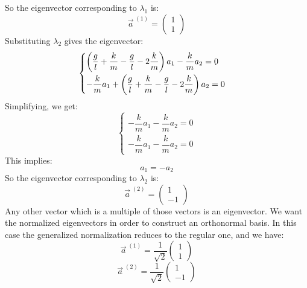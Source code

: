 So the eigenvector corresponding to $\lambda_1$ is:
\begin{equation}
    \vec{a}^{\;(1)} = \begin{pmatrix}
        1\\
        1
    \end{pmatrix}
\end{equation}
Substituting $\lambda_2$ gives the eigenvector:
\begin{equation}
    \begin{cases}
        \left(\dfrac{g}{l} + \dfrac{k}{m} - \dfrac{g}{l} - 2\dfrac{k}{m}\right) a_1 - \dfrac{k}{m} a_2 = 0\\[8pt]
        -\dfrac{k}{m} a_1 + \left(\dfrac{g}{l} + \dfrac{k}{m} - \dfrac{g}{l} - 2\dfrac{k}{m}\right) a_2 = 0
    \end{cases}
\end{equation}
Simplifying, we get:
\begin{equation}
    \begin{cases}
        -\dfrac{k}{m} a_1 - \dfrac{k}{m} a_2 = 0\\[8pt]
        -\dfrac{k}{m} a_1 - \dfrac{k}{m} a_2 = 0
    \end{cases}
\end{equation}
This implies:
\begin{equation}
    a_1 = -a_2
\end{equation}
So the eigenvector corresponding to $\lambda_2$ is:
\begin{equation}
    \vec{a}^{\;(2)} = \begin{pmatrix}
        1\\[8pt]
        -1
    \end{pmatrix}
\end{equation}
Any other vector which is a multiple of those vectors is an eigenvector. We want the normalized eigenvectors in order to construct an orthonormal basis. In this case the generalized normalization reduces to the regular one, and we have:
\begin{equation}
    \vec{a}^{\;(1)} = \dfrac{1}{\sqrt{2}}\begin{pmatrix}
        1\\[8pt]
        1
    \end{pmatrix}
\end{equation}
\begin{equation}
    \vec{a}^{\;(2)} = \dfrac{1}{\sqrt{2}}\begin{pmatrix}
        1\\[8pt]
        -1
    \end{pmatrix}
\end{equation}
